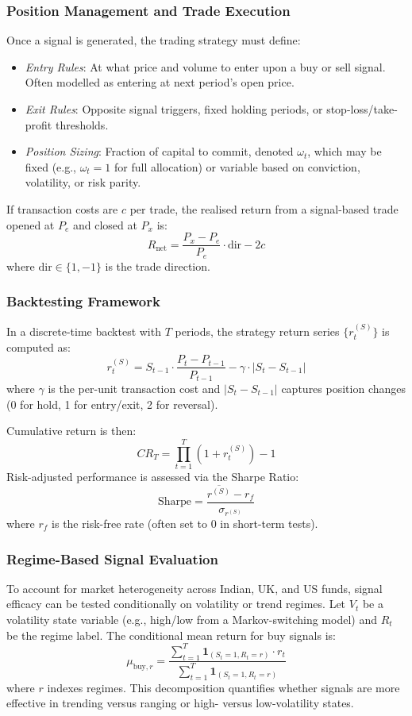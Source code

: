 \subsubsection{Position Management and Trade Execution}

Once a signal is generated, the trading strategy must define:
\begin{itemize}
    \item \textit{Entry Rules}: At what price and volume to enter upon a buy or sell signal. Often modelled as entering at next period's open price.
    \item \textit{Exit Rules}: Opposite signal triggers, fixed holding periods, or stop-loss/take-profit thresholds.
    \item \textit{Position Sizing}: Fraction of capital to commit, denoted $\omega_t$, which may be fixed (e.g., $\omega_t = 1$ for full allocation) or variable based on conviction, volatility, or risk parity.
\end{itemize}
If transaction costs are $c$ per trade, the realised return from a signal-based trade opened at $P_e$ and closed at $P_x$ is:
\[
R_{\text{net}} = \frac{P_x - P_e}{P_e} \cdot \text{dir} - 2c
\]
where $\text{dir} \in \{1, -1\}$ is the trade direction.

\subsubsection{Backtesting Framework}

In a discrete-time backtest with $T$ periods, the strategy return series $\{r_t^{(S)}\}$ is computed as:
\[
r_t^{(S)} = S_{t-1} \cdot \frac{P_t - P_{t-1}}{P_{t-1}} - \gamma \cdot |S_t - S_{t-1}|
\]
where $\gamma$ is the per-unit transaction cost and $|S_t - S_{t-1}|$ captures position changes (0 for hold, 1 for entry/exit, 2 for reversal).

Cumulative return is then:
\[
CR_T = \prod_{t=1}^T (1 + r_t^{(S)}) - 1
\]
Risk-adjusted performance is assessed via the Sharpe Ratio:
\[
\text{Sharpe} = \frac{\overline{r^{(S)}} - r_f}{\sigma_{r^{(S)}}}
\]
where $r_f$ is the risk-free rate (often set to 0 in short-term tests).

\subsubsection{Regime-Based Signal Evaluation}

To account for market heterogeneity across Indian, UK, and US funds, signal efficacy can be tested conditionally on volatility or trend regimes. Let $V_t$ be a volatility state variable (e.g., high/low from a Markov-switching model) and $R_t$ be the regime label. The conditional mean return for buy signals is:
\[
\mu_{\text{buy}, r} = \frac{\sum_{t=1}^T \mathbf{1}_{(S_t=1, R_t=r)} \cdot r_t}{\sum_{t=1}^T \mathbf{1}_{(S_t=1, R_t=r)}}
\]
where $r$ indexes regimes. This decomposition quantifies whether signals are more effective in trending versus ranging or high- versus low-volatility states.

